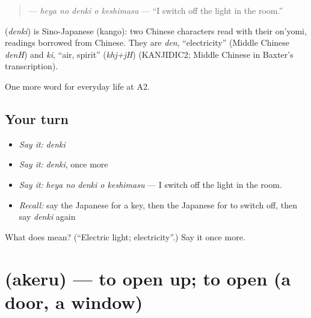 \begin{quote}
\textbf{  } — \emph{heya no denki o keshimasu} — \textquotedblleft{}I switch off the light in the room.\textquotedblright{}
\end{quote}

\begin{cousinweb}
\textbf{} (\emph{denki}) is Sino-Japanese (kango): two Chinese characters read with their on'yomi, readings borrowed from Chinese. They are \emph{den}, \textquotedblleft{}electricity\textquotedblright{} (Middle Chinese \emph{denH}) and \emph{ki}, \textquotedblleft{}air, spirit\textquotedblright{} (\emph{khj+jH}) (KANJIDIC2; Middle Chinese in Baxter's transcription).
\end{cousinweb}

\begin{grammarlens}[title={What you've built}]
One more word for everyday life at A2.
\end{grammarlens}

\subsection*{Your turn}
\begin{itemize}
\raggedright
  \item \emph{Say it:} \emph{denki}
  \item \emph{Say it:} \emph{denki}, once more
  \item \emph{Say it:} \emph{heya no denki o keshimasu} — I switch off the light in the room.
  \item \emph{Recall:} say the Japanese for a key, then the Japanese for to switch off, then say \emph{denki} again
\end{itemize}

\begin{tcolorbox}[breakable,colback=teal!4,colframe=teal!35!black,title={Before you move on}]
What does  mean? (\textquotedblleft{}Electric light; electricity\textquotedblright{}.) Say it once more.
\end{tcolorbox}
\section[\texorpdfstring{\ja{あける} (akeru)}{あける (akeru)}]{ (akeru) — to open up; to open (a door, a window)}

\label{lesson:JA-C158-akeru}



